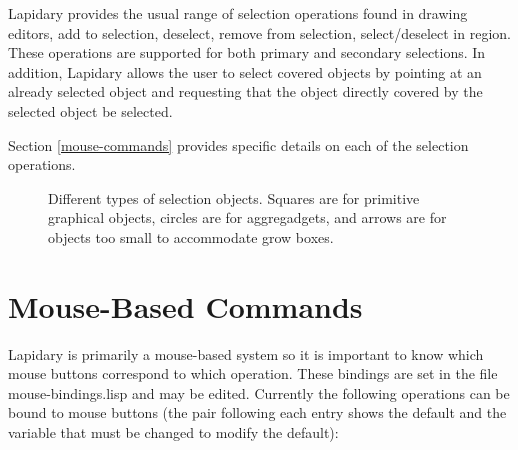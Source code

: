 Lapidary provides the usual range of selection
operations found in drawing editors\dashselect,
add to selection, deselect, remove from selection,
select/deselect in region. These operations are supported for
both primary and secondary selections.
In addition, Lapidary allows the user to select covered objects by pointing
at an already selected object and requesting that the object directly covered
by the selected object be selected.

Section \ref{mouse-commands} provides specific details on each of the
selection operations.

\begin{figure}
\begin{center}
\end{center}
\caption{Different types of selection objects.  Squares are for primitive
graphical objects, circles are for aggregadgets, and arrows are for objects
too small to accommodate grow boxes.}
\end{figure}

\section{Mouse-Based Commands}
\label{mouse-commands}
Lapidary is primarily a mouse-based system so it is important to know which
mouse buttons correspond to which operation.
These bindings are set in the file mouse-bindings.lisp and may be
edited.  Currently the following operations can
be bound to mouse buttons (the pair following each entry shows the
default and the variable that must be changed to modify the default):

